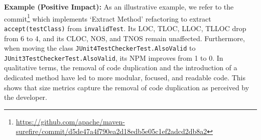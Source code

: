 \noindent\textbf{Example (Positive Impact):} As an illustrative example, we refer to the commit\footnote{\textcolor{black}{\url{https://github.com/apache/maven-surefire/commit/d5de47a4f790ea2d18edb5e05c1ef2adcd2db8a2}}} which implements `Extract Method' refactoring to extract \texttt{accept\break(testClass)} from \texttt{invalidTest}. Its LOC, TLOC, LLOC, TLLOC drop from 6 to 4, and its CLOC, NOS, and TNOS remain unaffected.  Furthermore, when moving the class \texttt{JUnit4TestCheckerTest.AlsoValid}  to \texttt{JUnit3TestChecker\break Test.AlsoValid}, its NPM improves from 1 to 0.  In qualitative terms, the removal of code duplication and the introduction of a dedicated method have led to more modular, focused, and readable code. This shows that size metrics capture the removal of code duplication as perceived by the developer.

